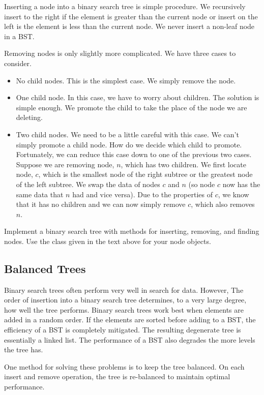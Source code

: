 Inserting a node into a binary search tree is simple procedure.
We recursively insert to the right if the element is greater than the current node
or insert on the left is the element is less than the current node.
We never insert a non-leaf node in a BST.

Removing nodes is only slightly more complicated.
We have three cases to consider.
\begin{itemize}
\item No child nodes.  This is the simplest case.  We simply remove the node.
\item One child node.  In this case, we have to worry about children.
The solution is simple enough. 
We promote the child to take the place of the node we are deleting.
\item Two child nodes.  We need to be a little careful with this case.
We can't simply promote a child node.  How do we decide which child to promote.
Fortunately, we can reduce this case down to one of the previous two cases.
Suppose we are removing node, $n$, which has two children.
We first locate node, $c$, which is the smallest node of the right subtree or the greatest node of the left subtree. 
We swap the data of nodes $c$ and $n$ (so node $c$ now has the same data that $n$ had and vice versa).
Due to the properties of $c$, we know that it has no children and we can now simply remove $c$, which also removes $n$.
\end{itemize}

\begin{problem}
Implement a binary search tree with methods for inserting, removing, and finding nodes.
Use the  class given in the text above for your node objects.
\end{problem}

\subsection*{Balanced Trees}
Binary search trees often perform very well in search for data.
However, The order of insertion into a binary search tree determines, to a very large degree, how well the tree performs.
Binary search trees work best when elements are added in a random order.
If the elements are sorted before adding to a BST, the efficiency of a BST is completely mitigated.  
The resulting degenerate tree is essentially a linked list.
The performance of a BST also degrades the more levels the tree has. 

One method for solving these problems is to keep the tree balanced.
On each insert and remove operation, the tree is re-balanced to maintain optimal performance.


